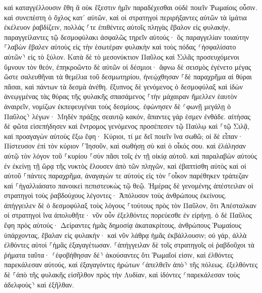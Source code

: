 \documentclass[twoside, 9pt]{extreport}
\begin{document}
καὶ καταγγέλλουσιν ἔθη ἃ οὐκ ἔξεστιν ἡμῖν παραδέχεσθαι οὐδὲ ποιεῖν Ῥωμαίοις οὖσιν. 
καὶ συνεπέστη ὁ ὄχλος κατ᾽ αὐτῶν, καὶ οἱ στρατηγοὶ περιρήξαντες αὐτῶν τὰ ἱμάτια ἐκέλευον ῥαβδίζειν, 
πολλάς ⸀τε ἐπιθέντες αὐτοῖς πληγὰς ἔβαλον εἰς φυλακήν, παραγγείλαντες τῷ δεσμοφύλακι ἀσφαλῶς τηρεῖν αὐτούς· 
ὃς παραγγελίαν τοιαύτην ⸀λαβὼν ἔβαλεν αὐτοὺς εἰς τὴν ἐσωτέραν φυλακὴν καὶ τοὺς πόδας ⸂ἠσφαλίσατο αὐτῶν⸃ εἰς τὸ ξύλον. 
Κατὰ δὲ τὸ μεσονύκτιον Παῦλος καὶ Σιλᾶς προσευχόμενοι ὕμνουν τὸν θεόν, ἐπηκροῶντο δὲ αὐτῶν οἱ δέσμιοι· 
ἄφνω δὲ σεισμὸς ἐγένετο μέγας ὥστε σαλευθῆναι τὰ θεμέλια τοῦ δεσμωτηρίου, ἠνεῴχθησαν ⸀δὲ παραχρῆμα αἱ θύραι πᾶσαι, καὶ πάντων τὰ δεσμὰ ἀνέθη. 
ἔξυπνος δὲ γενόμενος ὁ δεσμοφύλαξ καὶ ἰδὼν ἀνεῳγμένας τὰς θύρας τῆς φυλακῆς σπασάμενος ⸀τὴν μάχαιραν ἤμελλεν ἑαυτὸν ἀναιρεῖν, νομίζων ἐκπεφευγέναι τοὺς δεσμίους. 
ἐφώνησεν δὲ ⸂φωνῇ μεγάλῃ ὁ Παῦλος⸃ λέγων· Μηδὲν πράξῃς σεαυτῷ κακόν, ἅπαντες γάρ ἐσμεν ἐνθάδε. 
αἰτήσας δὲ φῶτα εἰσεπήδησεν καὶ ἔντρομος γενόμενος προσέπεσεν τῷ Παύλῳ καὶ ⸀τῷ Σιλᾷ, 
καὶ προαγαγὼν αὐτοὺς ἔξω ἔφη· Κύριοι, τί με δεῖ ποιεῖν ἵνα σωθῶ; 
οἱ δὲ εἶπαν· Πίστευσον ἐπὶ τὸν κύριον ⸀Ἰησοῦν, καὶ σωθήσῃ σὺ καὶ ὁ οἶκός σου. 
καὶ ἐλάλησαν αὐτῷ τὸν λόγον τοῦ ⸀κυρίου ⸀σὺν πᾶσι τοῖς ἐν τῇ οἰκίᾳ αὐτοῦ. 
καὶ παραλαβὼν αὐτοὺς ἐν ἐκείνῃ τῇ ὥρᾳ τῆς νυκτὸς ἔλουσεν ἀπὸ τῶν πληγῶν, καὶ ἐβαπτίσθη αὐτὸς καὶ οἱ αὐτοῦ ⸀πάντες παραχρῆμα, 
ἀναγαγών τε αὐτοὺς εἰς τὸν ⸀οἶκον παρέθηκεν τράπεζαν καὶ ⸀ἠγαλλιάσατο πανοικεὶ πεπιστευκὼς τῷ θεῷ. 
Ἡμέρας δὲ γενομένης ἀπέστειλαν οἱ στρατηγοὶ τοὺς ῥαβδούχους λέγοντες· Ἀπόλυσον τοὺς ἀνθρώπους ἐκείνους. 
ἀπήγγειλεν δὲ ὁ δεσμοφύλαξ τοὺς λόγους ⸀τούτους πρὸς τὸν Παῦλον, ὅτι Ἀπέσταλκαν οἱ στρατηγοὶ ἵνα ἀπολυθῆτε· νῦν οὖν ἐξελθόντες πορεύεσθε ἐν εἰρήνῃ. 
ὁ δὲ Παῦλος ἔφη πρὸς αὐτούς· Δείραντες ἡμᾶς δημοσίᾳ ἀκατακρίτους, ἀνθρώπους Ῥωμαίους ὑπάρχοντας, ἔβαλαν εἰς φυλακήν· καὶ νῦν λάθρᾳ ἡμᾶς ἐκβάλλουσιν; οὐ γάρ, ἀλλὰ ἐλθόντες αὐτοὶ ⸀ἡμᾶς ἐξαγαγέτωσαν. 
⸀ἀπήγγειλαν δὲ τοῖς στρατηγοῖς οἱ ῥαβδοῦχοι τὰ ῥήματα ταῦτα· ⸂ἐφοβήθησαν δὲ⸃ ἀκούσαντες ὅτι Ῥωμαῖοί εἰσιν, 
καὶ ἐλθόντες παρεκάλεσαν αὐτούς, καὶ ἐξαγαγόντες ἠρώτων ⸂ἀπελθεῖν ἀπὸ⸃ τῆς πόλεως. 
ἐξελθόντες δὲ ⸀ἀπὸ τῆς φυλακῆς εἰσῆλθον πρὸς τὴν Λυδίαν, καὶ ἰδόντες ⸂παρεκάλεσαν τοὺς ἀδελφοὺς⸃ καὶ ἐξῆλθαν. 
\end{document}
